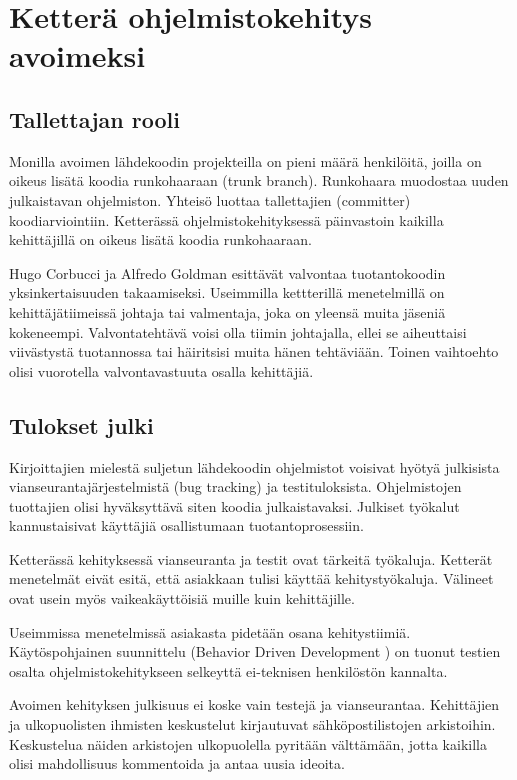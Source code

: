 \documentclass[finnish]{tktltiki2}
\theoremstyle{definition}
\theoremstyle{remark}
\begin{document}
\section{Ketterä ohjelmistokehitys avoimeksi}

\subsection{Tallettajan rooli}

Monilla avoimen lähdekoodin projekteilla on pieni määrä henkilöitä, joilla on oikeus lisätä koodia runkohaaraan (trunk branch). Runkohaara muodostaa uuden julkaistavan ohjelmiston. Yhteisö luottaa tallettajien (committer) koodiarviointiin. Ketterässä ohjelmistokehityksessä päinvastoin kaikilla kehittäjillä on oikeus lisätä koodia runkohaaraan.

Hugo Corbucci ja Alfredo Goldman esittävät valvontaa tuotantokoodin yksinkertaisuuden takaamiseksi. Useimmilla kettterillä menetelmillä on kehittäjätiimeissä johtaja tai valmentaja, joka on yleensä muita jäseniä kokeneempi. Valvontatehtävä voisi olla tiimin johtajalla, ellei se aiheuttaisi viivästystä tuotannossa tai häiritsisi muita hänen tehtäviään. Toinen vaihtoehto olisi vuorotella valvontavastuuta osalla kehittäjiä.

\subsection{Tulokset julki}

Kirjoittajien mielestä suljetun lähdekoodin ohjelmistot voisivat hyötyä julkisista vianseurantajärjestelmistä (bug tracking) ja testituloksista. Ohjelmistojen tuottajien olisi hyväksyttävä siten koodia julkaistavaksi. Julkiset työkalut kannustaisivat käyttäjiä osallistumaan tuotantoprosessiin.

Ketterässä kehityksessä vianseuranta ja testit ovat tärkeitä työkaluja. Ketterät menetelmät  eivät esitä, että asiakkaan tulisi käyttää kehitystyökaluja. Välineet ovat usein myös vaikeakäyttöisiä muille kuin kehittäjille. 

Useimmissa menetelmissä asiakasta pidetään osana kehitystiimiä. Käytöspohjainen suunnittelu (Behavior Driven Development ) on tuonut testien osalta ohjelmistokehitykseen selkeyttä ei-teknisen henkilöstön kannalta.

Avoimen kehityksen julkisuus ei koske vain testejä ja vianseurantaa. Kehittäjien ja ulkopuolisten ihmisten keskustelut kirjautuvat sähköpostilistojen arkistoihin. Keskustelua näiden arkistojen ulkopuolella pyritään välttämään, jotta kaikilla olisi mahdollisuus kommentoida ja antaa uusia ideoita.
\end{document}
